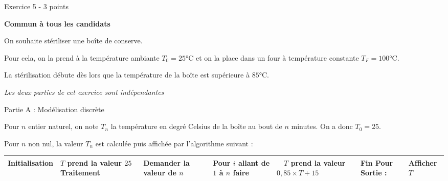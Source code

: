 
%
\begin{h2}Exercice 5 - 3 points\end{h2} 
\par
\textbf{Commun à tous les candidats}
\par
On souhaite stériliser une boîte de conserve.
\par
Pour cela, on la prend à la température ambiante $T_0 = 25$°C et on la place dans un four à température constante $T_F = 100$°C.
\par
La stérilisation débute dès lors que la température de la boîte est supérieure à $85$°C.
\par
\textit{Les deux parties de cet exercice sont indépendantes}
\par
\begin{h3}Partie A : Modélisation discrète\end{h3}
Pour $n$ entier naturel, on note $T_n$ la température en degré Celsius de la boîte au bout de $n$ minutes. On a donc $T_0 = 25$.
\par
Pour $n$ non nul, la valeur $T_n$ est calculée puis affichée par l'algorithme suivant :
     \begin{tabularx}{0.8\linewidth}{|*{3}{>{\centering \arraybackslash }X|}}%
          \hline

          \textbf{Initialisation}  &  $T$ prend la valeur $25$
          \hline
               \textbf{Traitement	}  & Demander la valeur de $n$
          \hline
       &  Pour $i$ allant de $1$ à $n$ faire
          \hline
& $  \quad T$ prend la valeur $0,85 \times T + 15$
          \hline
& Fin Pour
\textbf{Sortie }: &Afﬁcher $T$
          \\ \hline
     \end{tabularx}

